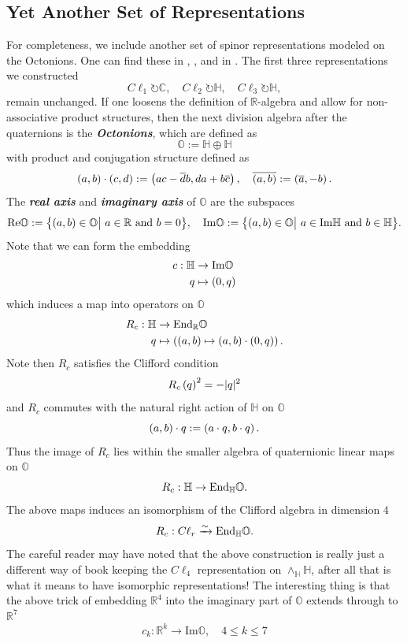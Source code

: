 \documentclass[openany, 11pt]{article}
\theoremstyle{definition}
\theoremstyle{remark}
\def\lp{\ensuremath{\left(}}
\def\rp{\ensuremath{\right)}}
\def\bC{\ensuremath{\mathbb{C}}}
\def\bH{\ensuremath{\mathbb{H}}}
\def\bR{\ensuremath{\mathbb{R}}}
\def\bO{\ensuremath{\mathbb{O}}}
\def\End{\ensuremath{\textnormal{End}}}
\begin{document}
\subsection{Yet Another Set of Representations}
For completeness, we include another set of spinor representations modeled on the Octonions. One can find these in \cite{LM}, \cite{E}, and in \cite{RB}. The first three representations we constructed 
\[
    C\ell_1\circlearrowright\bC,\quad C\ell_2\circlearrowright\bH,\quad C\ell_3\circlearrowright\bH,
\]
remain unchanged. If one loosens the definition of $\bR$-algebra and allow for non-associative product structures, then the next division algebra after the quaternions is the \textbf{\emph{Octonions}}, which are defined as
\[
    \bO:=\bH\oplus\bH
\]
with product and conjugation structure defined as
\[
    \lp a,b\rp\cdot\lp c,d\rp:=\lp ac-\overline{d}b,da+b\overline{c}\rp,\quad \overline{\lp a,b\rp}:=\lp \overline{a},-b\rp.
\]
The \textbf{\emph{real axis}} and \textbf{\emph{imaginary axis}} of $\bO$ are the subspaces
\[
    \text{Re}\bO:=\bigl\{\lp a,b\rp\in\bO\big|\text{ $a\in\bR$ and $b=0$}\bigr\},\quad \text{Im}\bO:=\bigl\{\lp a,b\rp\in\bO\big|\text{ $a\in\text{Im}\bH$ and $b\in\bH$}\bigr\}.
\]
Note that we can form the embedding
\begin{align*}
    c:\bH&\rightarrow \text{Im}\bO\\
    q&\mapsto\lp 0,q\rp
\end{align*}
which induces a map into operators on $\bO$
\begin{align*}
    R_c:\bH&\rightarrow\End_{\bR}\bO\\
    q&\mapsto\lp \lp a,b\rp\mapsto \lp a,b\rp\cdot\lp 0,q\rp\rp.
\end{align*}
Note then $R_c$ satisfies the Clifford condition
\[
    R_c\lp q\rp^2=-|q|^2
\]
and $R_c$ commutes with the natural right action of $\bH$ on $\bO$
\[
    \lp a,b\rp\cdot q:=\lp a\cdot q,b\cdot q\rp.
\]
Thus the image of $R_c$ lies within the smaller algebra of quaternionic linear maps on $\bO$
\[
    R_c:\bH\rightarrow \End_{\bH}\bO.
\]
The above maps induces an isomorphism of the Clifford algebra in dimension $4$
\[
    R_c:C\ell_r\xrightarrow{\sim}\End_{\bH}\bO.
\]
The careful reader may have noted that the above construction is really just a different way of book keeping the $C\ell_4$ representation on $\wedge_{\bH}\bH$, after all that is what it means to have isomorphic representations! The interesting thing is that the above trick of embedding $\bR^4$ into the imaginary part of $\bO$ extends through to $\bR^7$
\[
    c_k:\bR^k\rightarrow\text{Im}\bO,\quad 4\leq k\leq 7
\]
\end{document}
